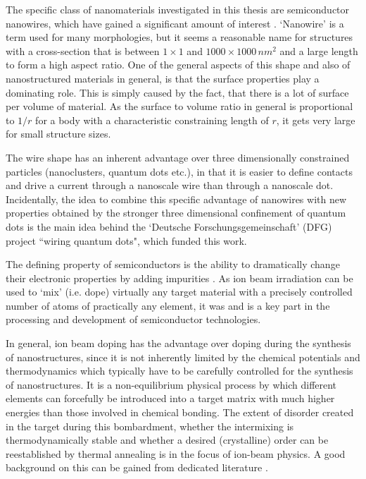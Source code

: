 The specific class of nanomaterials investigated in this thesis are semiconductor nanowires, which have gained a significant amount of  interest \cite{huang_room-temperature_2001,cui_nanowire_2001,duan_indium_2001,xia_one-dimensional_2003,lieber_functional_2007}. `Nanowire' is a term used for many morphologies, but it seems a reasonable name for structures with a cross-section that is between $1 \times 1$ and $1000 \times 1000\,nm^2$ and a large length to form a high aspect ratio. One of the general aspects of this shape and also of nanostructured materials in general, is that the surface properties play a dominating role. This is simply caused by the fact, that there is a lot of surface per volume of material. As the surface to volume ratio in general is proportional to $1/r$ for a body with a characteristic constraining length of $r$, it gets very large for small structure sizes.

The wire shape has an inherent advantage over three dimensionally constrained particles (nanoclusters, quantum dots etc.), in that it is easier to define contacts and drive a current through a nanoscale wire than through a nanoscale dot. Incidentally, the idea to combine this specific advantage of nanowires with new properties obtained by the stronger three dimensional confinement of quantum dots is the main idea behind the `Deutsche Forschungsgemeinschaft' (DFG) project ``wiring quantum dots", which funded this work. 

The defining property of semiconductors is the ability to dramatically change their electronic properties by adding impurities \cite{sze_physics_2006}. As ion beam irradiation can be used to `mix' (i.e. dope) virtually any target material with a precisely controlled number of atoms of practically any element, it was and is a key part in the processing and development of semiconductor technologies. 

In general, ion beam doping has the advantage over doping during the synthesis of nanostructures, since it is not inherently limited by the chemical potentials and thermodynamics which typically have to be carefully controlled for the synthesis of nanostructures. It is a non-equilibrium physical process by which different elements can forcefully be introduced into a target matrix with much higher energies than those involved in chemical bonding. The extent of disorder created in the target during this bombardment, whether the intermixing is thermodynamically stable and whether a desired (crystalline) order can be reestablished by thermal annealing is in the focus of ion-beam physics. A good background on this can be gained from dedicated literature \cite{ziegler_stopping_1985,eckstein_computer_1991,nastasi/mayer/hirvonen_ion-solid_2008,schmidt_ion_2012}.

